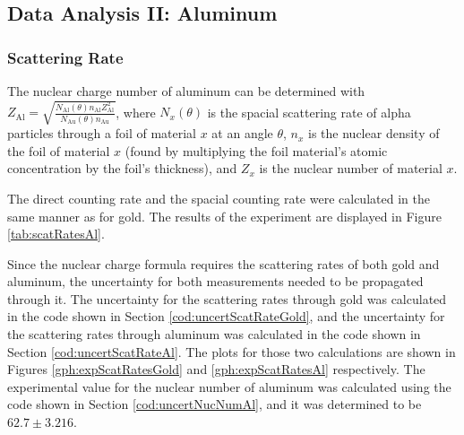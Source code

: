 \documentclass[a4paper]{article}
\begin{document}
\subsection{Data Analysis II: Aluminum}

\subsubsection{Scattering Rate}

\qq The nuclear charge number of aluminum can be determined with \\
\( Z_{\text{Al}} = \sqrt{\frac{N_{\text{Al}} (\theta) n_{\text{Al}}
    Z^2_{\text{Al}}}{N_{\text{Au}} (\theta) n_{\text{Au}}}} \), where
\( N_x (\theta) \) is the spacial scattering rate of alpha particles through a
foil of material \( x \) at an angle \( \theta \), \( n_x \) is the nuclear
density of the foil of material \( x \) (found by multiplying the foil
material's atomic concentration by the foil's thickness), and \( Z_x \) is the
nuclear number of material \( x \).

\qq The direct counting rate and the spacial counting rate were calculated in
the same manner as for gold. The results of the experiment are displayed in
Figure \ref{tab:scatRatesAl}.

\qq

\qq Since the nuclear charge formula requires the scattering rates of both gold
and aluminum, the uncertainty for both measurements needed to be propagated
through it. The uncertainty for the scattering rates through gold was calculated
in the code shown in Section \ref{cod:uncertScatRateGold}, and the uncertainty
for the scattering rates through aluminum was calculated in the code shown in
Section \ref{cod:uncertScatRateAl}. The plots for those two calculations are
shown in Figures \ref{gph:expScatRatesGold} and \ref{gph:expScatRatesAl}
respectively. The experimental value for the nuclear number of aluminum was
calculated using the code shown in Section \ref{cod:uncertNucNumAl}, and it was
determined to be \( 62.7 \pm 3.216 \).
\end{document}

